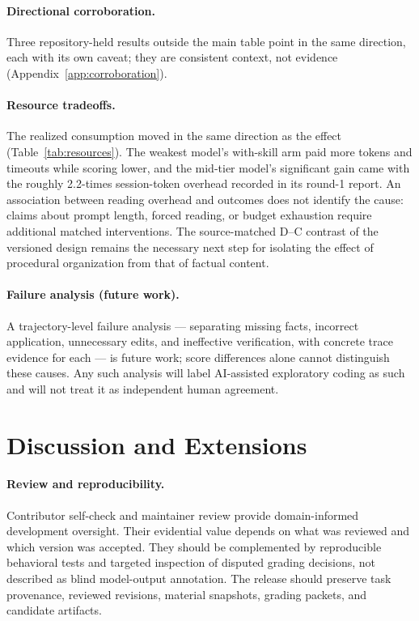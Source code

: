 \documentclass[11pt]{article}
\begin{document}
\paragraph{Directional corroboration.}
Three repository-held results outside the main table point in the same direction, each with its own caveat; they are consistent context, not evidence (Appendix~\ref{app:corroboration}).

\paragraph{Resource tradeoffs.}
The realized consumption moved in the same direction as the effect (Table~\ref{tab:resources}).
The weakest model's with-skill arm paid more tokens and timeouts while scoring lower, and the mid-tier model's significant gain came with the roughly 2.2-times session-token overhead recorded in its round-1 report.
An association between reading overhead and outcomes does not identify the cause: claims about prompt length, forced reading, or budget exhaustion require additional matched interventions.
The source-matched D--C contrast of the versioned design remains the necessary next step for isolating the effect of procedural organization from that of factual content.

\paragraph{Failure analysis (future work).}
\label{sec:failures}
A trajectory-level failure analysis --- separating missing facts, incorrect application, unnecessary edits, and ineffective verification, with concrete trace evidence for each --- is future work; score differences alone cannot distinguish these causes.
Any such analysis will label AI-assisted exploratory coding as such and will not treat it as independent human agreement.

\section{Discussion and Extensions}
\label{sec:discussion}

\paragraph{Review and reproducibility.}
Contributor self-check and maintainer review provide domain-informed development oversight.
Their evidential value depends on what was reviewed and which version was accepted.
They should be complemented by reproducible behavioral tests and targeted inspection of disputed grading decisions, not described as blind model-output annotation.
The release should preserve task provenance, reviewed revisions, material snapshots, grading packets, and candidate artifacts.
\end{document}
